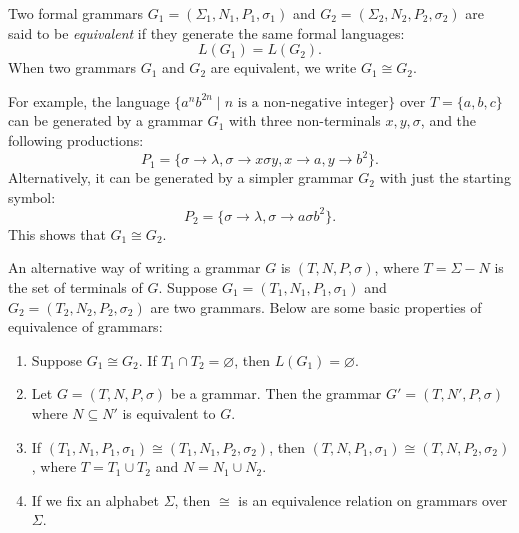 \documentclass[12pt]{article}
\begin{document}


Two formal grammars $G_1=(\Sigma_1,N_1,P_1,\sigma_1)$ and $G_2=(\Sigma_2,N_2,P_2,\sigma_2)$ are said to be \emph{equivalent} if they generate the same formal languages: $$L(G_1)=L(G_2).$$
When two grammars $G_1$ and $G_2$ are equivalent, we write $G_1\cong G_2$.

For example, the language $\lbrace a^nb^{2n}\mid n\mbox{ is a non-negative integer}\rbrace$ over $T=\lbrace a,b,c\rbrace$ can be generated by a grammar $G_1$ with three non-terminals $x,y,\sigma$, and the following productions:
$$P_1=\lbrace \sigma \to \lambda, \sigma \to x\sigma y, x\to a, y\to b^2 \rbrace.$$
Alternatively, it can be generated by a simpler grammar $G_2$ with just the starting symbol:
$$P_2=\lbrace \sigma \to \lambda, \sigma \to a\sigma b^2\rbrace.$$
This shows that $G_1 \cong G_2$.

An alternative way of writing a grammar $G$ is $(T,N,P,\sigma)$, where $T=\Sigma-N$ is the set of terminals of $G$.  Suppose $G_1=(T_1,N_1,P_1,\sigma_1)$ and $G_2=(T_2,N_2,P_2,\sigma_2)$ are two grammars.  Below are some basic properties of equivalence of grammars: 
\begin{enumerate}
\item
Suppose $G_1\cong G_2$.  If $T_1\cap T_2=\varnothing$, then $L(G_1)=\varnothing$.
\item
Let $G=(T,N,P,\sigma)$ be a grammar.  Then the grammar $G'=(T,N',P,\sigma)$ where $N\subseteq N'$ is equivalent to $G$.
\item
If $(T_1,N_1,P_1,\sigma_1)\cong (T_1,N_1,P_2,\sigma_2)$, then $(T,N,P_1,\sigma_1)\cong (T,N,P_2,\sigma_2)$, where $T=T_1\cup T_2$ and $N=N_1\cup N_2$.
\item
If we fix an alphabet $\Sigma$, then $\cong$ is an equivalence relation on grammars over $\Sigma$.
\end{enumerate}
\end{document}
